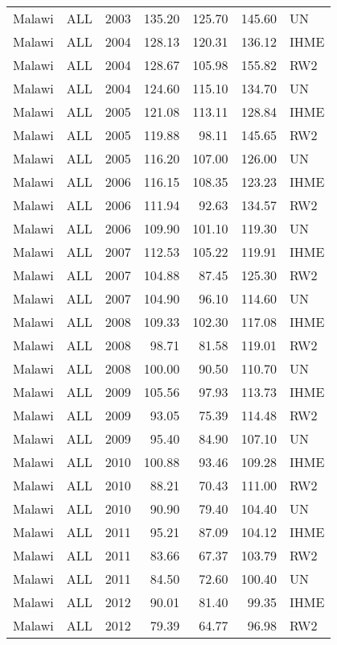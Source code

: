 \begin{longtable}{lllrrrl}
  Malawi & ALL & 2003 & 135.20 & 125.70 & 145.60 & UN \\ 
  Malawi & ALL & 2004 & 128.13 & 120.31 & 136.12 & IHME \\ 
  Malawi & ALL & 2004 & 128.67 & 105.98 & 155.82 & RW2 \\ 
  Malawi & ALL & 2004 & 124.60 & 115.10 & 134.70 & UN \\ 
  Malawi & ALL & 2005 & 121.08 & 113.11 & 128.84 & IHME \\ 
  Malawi & ALL & 2005 & 119.88 & 98.11 & 145.65 & RW2 \\ 
  Malawi & ALL & 2005 & 116.20 & 107.00 & 126.00 & UN \\ 
  Malawi & ALL & 2006 & 116.15 & 108.35 & 123.23 & IHME \\ 
  Malawi & ALL & 2006 & 111.94 & 92.63 & 134.57 & RW2 \\ 
  Malawi & ALL & 2006 & 109.90 & 101.10 & 119.30 & UN \\ 
  Malawi & ALL & 2007 & 112.53 & 105.22 & 119.91 & IHME \\ 
  Malawi & ALL & 2007 & 104.88 & 87.45 & 125.30 & RW2 \\ 
  Malawi & ALL & 2007 & 104.90 & 96.10 & 114.60 & UN \\ 
  Malawi & ALL & 2008 & 109.33 & 102.30 & 117.08 & IHME \\ 
  Malawi & ALL & 2008 & 98.71 & 81.58 & 119.01 & RW2 \\ 
  Malawi & ALL & 2008 & 100.00 & 90.50 & 110.70 & UN \\ 
  Malawi & ALL & 2009 & 105.56 & 97.93 & 113.73 & IHME \\ 
  Malawi & ALL & 2009 & 93.05 & 75.39 & 114.48 & RW2 \\ 
  Malawi & ALL & 2009 & 95.40 & 84.90 & 107.10 & UN \\ 
  Malawi & ALL & 2010 & 100.88 & 93.46 & 109.28 & IHME \\ 
  Malawi & ALL & 2010 & 88.21 & 70.43 & 111.00 & RW2 \\ 
  Malawi & ALL & 2010 & 90.90 & 79.40 & 104.40 & UN \\ 
  Malawi & ALL & 2011 & 95.21 & 87.09 & 104.12 & IHME \\ 
  Malawi & ALL & 2011 & 83.66 & 67.37 & 103.79 & RW2 \\ 
  Malawi & ALL & 2011 & 84.50 & 72.60 & 100.40 & UN \\ 
  Malawi & ALL & 2012 & 90.01 & 81.40 & 99.35 & IHME \\ 
  Malawi & ALL & 2012 & 79.39 & 64.77 & 96.98 & RW2 \\ 

\end{longtable}
